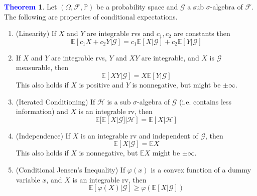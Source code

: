 \documentclass[11pt]{article}
\theoremstyle{definition}
\theoremstyle{definition}
\newtheorem{theorem}{\textcolor{blue}{Theorem}}
\theoremstyle{definition}
\theoremstyle{remark}
\begin{document}
\begin{theorem}
    Let $(\Omega, \mathcal{F}, \mathbb{P})$ be a probability space and $\mathcal{G}$ a sub $\sigma$-algebra of
    $\mathcal{F}$. The following are properties of conditional expectations.
    \begin{enumerate}
        \item (Linearity) If $X$ and $Y$ are integrable rvs and $c_1, c_2$ are constants then
        \[
            \mathbb{E}[c_1 X + c_2 Y | \mathcal{G}] =  c_1\mathbb{E}[X | \mathcal{G}] + c_2 \mathbb{E}[Y | \mathcal{G}]
        \]    
        \item If $X$ and $Y$ are integrable rvs, $Y$ and $XY$ are integrable, and $X$ is $\mathcal{G}$ measurable, then
        \[
            \mathbb{E}[XY | \mathcal{G}] = X \mathbb{E}[Y | \mathcal{G}]
        \]       
        This also holds if $X$ is positive and $Y$ is nonnegative, but might be $\pm \infty$.
        \item (Iterated Conditioning) If $\mathcal{H}$ is a sub $\sigma$-algebra of $\mathcal{G}$ (i.e. contains less information) and $X$ is an integrable
        rv, then
        \[
            \mathbb{E}[\mathbb{E}[X | \mathcal{G}] | \mathcal{H}] = \mathbb{E}[X | \mathcal{H}]
        \]     
        \item (Independence) If $X$ is an integrable rv and independent of $\mathcal{G}$, then
        \[
            \mathbb{E}[X | \mathcal{G}] = \mathbb{E} X
        \]  
        This also holds if $X$ is nonnegative, but $\mathbb{E} X $ might be $\pm \infty$.   
        \item (Conditional Jensen's Inequality) If $\varphi(x)$ is a convex function of a dummy variable $x$,
        and $X$ is an integrable rv, then 
        \[
            \mathbb{E}[\varphi(X) | \mathcal{G}] \geq \varphi(\mathbb{E}[X | \mathcal{G}])
        \]    
    \end{enumerate}    
\end{theorem}
\end{document}
